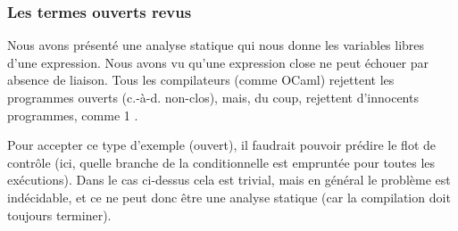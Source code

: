 % 
\begin{frame}
\frametitle{Les termes ouverts revus}

Nous avons présenté une analyse statique qui nous donne les variables
libres d'une expression. Nous avons vu qu'une expression close ne peut
échouer par absence de liaison. Tous les compilateurs (comme OCaml)
rejettent les programmes ouverts (c.-à-d. non-clos), mais, du coup,
rejettent d'innocents programmes, comme \Xif{} \Xtrue{} \Xthen{}
\num{1} \Xelse{} .

\bigskip

Pour accepter ce type d'exemple (ouvert), il faudrait pouvoir prédire
le flot de contrôle (ici, quelle branche de la conditionnelle est
empruntée pour toutes les exécutions). Dans le cas ci-dessus cela est
trivial, mais en général le problème est indécidable, et ce ne peut
donc être une analyse statique (car la compilation doit toujours
terminer).

\end{frame}
